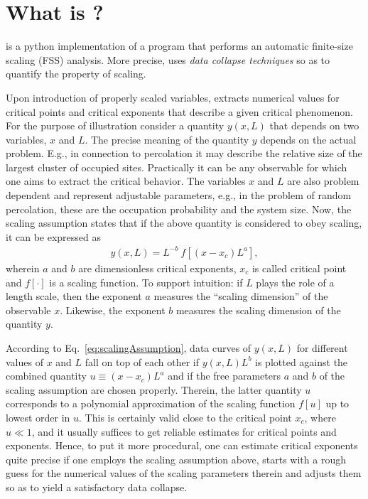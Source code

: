 %
%
%
\section{What is \myProg{}?}
\label{ASAsect01}
\myProg{} \cite{ASAmyProg} is a python \cite{ASApyRef} implementation of a program that performs an automatic 
finite-size scaling (FSS) analysis. 
More precise, \myProg{} uses \emph{data collapse techniques} so as to quantify 
the property of scaling.

Upon introduction of properly scaled variables, \myProg{} extracts numerical 
values for critical points and critical exponents that describe a given 
critical phenomenon. 
For the purpose of illustration consider
a quantity $y(x,L)$ that depends on two variables, $x$ and $L$. 
The precise meaning of the quantity $y$ depends on the actual problem.
E.g., in connection to percolation it may describe the relative size of the largest 
cluster of occupied sites. Practically it can be any observable for which one aims 
to extract the critical behavior.
The variables $x$ and $L$ are also problem dependent and represent adjustable 
parameters, e.g., in the problem of random percolation, these are the 
occupation probability and the system size.
Now, the scaling assumption states that if the above quantity is considered to obey 
scaling, it can be expressed as
\begin{eqnarray}
y(x,L)= L^{-b}~f[(x-x_c) L^a], \label{eq:scalingAssumption}
\end{eqnarray}
wherein $a$ and $b$ are dimensionless critical exponents, $x_c$ is called critical point 
and $f[ \cdot ]$ is a scaling function.   
To support intuition: if $L$ plays the role of a length scale, then the exponent $a$ 
measures the ``scaling dimension'' of the observable $x$. Likewise, the exponent $b$ 
measures the scaling dimension of the quantity $y$.

According to Eq.\ \ref{eq:scalingAssumption}, data curves of $y(x,L)$ for 
different values of $x$ and $L$ fall on top of each other if $y(x,L) L^{b}$ is plotted
against the combined quantity $u\!\equiv\!(x\!-\!x_c) L^a$ and if the free parameters $a$ and $b$ of 
the scaling assumption are chosen properly.    
Therein, the latter quantity $u$ corresponds to a polynomial 
approximation of the scaling function $f[u]$ up to lowest order in $u$. This
is certainly valid close to the critical point $x_c$, where $u\!\ll\!1$, and it usually
suffices to get reliable estimates for critical points and exponents.
Hence, to put it more procedural, one can estimate critical exponents quite precise if 
one employs the scaling assumption above, starts with a rough guess for the numerical 
values of the scaling parameters therein
and adjusts them so as to yield a satisfactory data collapse.

